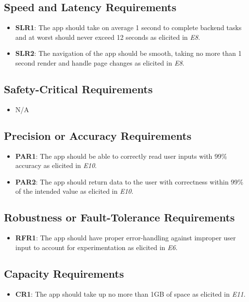 \documentclass[12pt]{article}
\begin{document}
\subsection{Speed and Latency Requirements}
\begin{itemize}
  \item \textbf{SLR1}: The app should take on average 1 second to complete backend tasks and at worst should never
  exceed 12 seconds as elicited in \textit{E8}.
  \item \textbf{SLR2}: The navigation of the app should be smooth, taking no more than 1 second render and handle page changes
  as elicited in \textit{E8}.
\end{itemize}
\subsection{Safety-Critical Requirements}
\begin{itemize}
  \item N/A
\end{itemize}
\subsection{Precision or Accuracy Requirements}
\begin{itemize}
  \item \textbf{PAR1}: The app should be able to correctly read user inputs with 99\% accuracy as elicited
  in \textit{E10}.
  \item \textbf{PAR2}: The app should return data to the user with correctness within 99\% of the intended value
  as elicited in \textit{E10}.
\end{itemize}
\subsection{Robustness or Fault-Tolerance Requirements}
\begin{itemize}
  \item \textbf{RFR1}: The app should have proper error-handling against improper user input to account for
  experimentation as elicited in \textit{E6}.
\end{itemize}
\subsection{Capacity Requirements}
\begin{itemize}
  \item \textbf{CR1}: The app should take up no more than 1GB of space as elicited in \textit{E11}.
\end{itemize}
\end{document}
